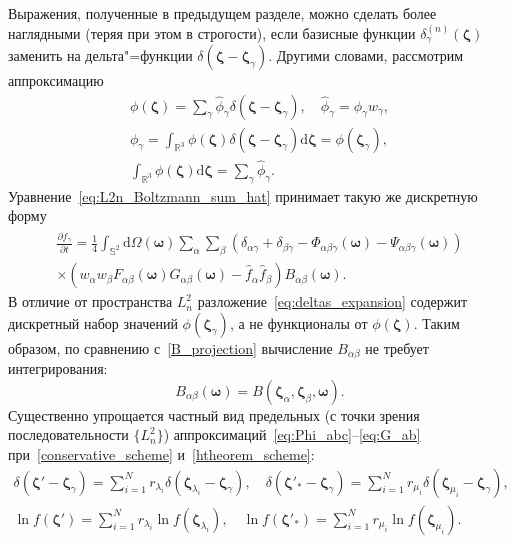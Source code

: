 \documentclass{article}
\newcommand{\dd}{\mathrm{d}}
\newcommand{\pder}[2][]{\frac{\partial#1}{\partial#2}}
\newcommand{\dzeta}{\boldsymbol{\dd\zeta}}
\newcommand{\bzeta}{\boldsymbol{\zeta}}
\newcommand{\bomega}{\boldsymbol{\omega}}
\begin{document}
Выражения, полученные в предыдущем разделе, можно сделать более наглядными (теряя при этом в строгости),
если базисные функции \(\delta^{(n)}_\gamma(\bzeta)\) заменить на дельта"=функции \(\delta(\bzeta-\bzeta_\gamma)\).
Другими словами, рассмотрим аппроксимацию
\begin{gather}
    \phi(\bzeta) = \sum_\gamma \hat{\phi}_\gamma \delta(\bzeta-\bzeta_\gamma),
    \quad \hat{\phi}_\gamma = \phi_\gamma w_\gamma, \label{eq:deltas_expansion} \\
    \phi_\gamma = \int_{\mathbb{R}^3} \phi(\bzeta) \delta(\bzeta-\bzeta_\gamma) \dzeta = \phi(\bzeta_\gamma), \label{eq:deltas_coords} \\
    \int_{\mathbb{R}^3} \phi(\bzeta)\dzeta = \sum_\gamma \hat{\phi}_\gamma. \label{eq:deltas_integral}
\end{gather}
Уравнение~\eqref{eq:L2n_Boltzmann_sum_hat} принимает такую же дискретную форму
\begin{multline}\label{eq:deltas_Boltzmann_sum_hat}
    \pder[\hat{f}_\gamma]{t} =
        \frac14\int_{\mathbb{S}^2}\dd\Omega(\bomega) \sum_\alpha \sum_\beta
        \left(\delta_{\alpha\gamma} + \delta_{\beta\gamma}
            - \Phi_{\alpha\beta\gamma}(\bomega) - \Psi_{\alpha\beta\gamma}(\bomega)\right) \\
        \times\left(w_\alpha w_\beta F_{\alpha\beta}(\bomega)G_{\alpha\beta}(\bomega)
            - \hat{f}_\alpha \hat{f}_\beta\right)
        B_{\alpha\beta}(\bomega).
\end{multline}
В отличие от пространства \(L^2_n\) разложение~\eqref{eq:deltas_expansion} содержит дискретный набор значений \(\phi(\bzeta_\gamma)\),
а не функционалы от \(\phi(\bzeta)\). Таким образом, по сравнению с~\eqref{B_projection} вычисление \(B_{\alpha\beta}\)
не требует интегрирования:
\begin{equation}\label{B_exact}
    B_{\alpha\beta}(\bomega) = B(\bzeta_\alpha,\bzeta_\beta,\bomega).
\end{equation}
Существенно упрощается частный вид предельных (с точки зрения последовательности \(\{L^2_n\}\))
аппроксимаций~\eqref{eq:Phi_abc}--\eqref{eq:G_ab} при~\eqref{conservative_scheme} и~\eqref{htheorem_scheme}:
\begin{gather}
    \delta(\bzeta'-\bzeta_\gamma) = \sum_{i=1}^N r_{\lambda_i} \delta(\bzeta_{\lambda_i}-\bzeta_\gamma), \quad
    \delta(\bzeta'_*-\bzeta_\gamma) = \sum_{i=1}^N r_{\mu_i}\delta(\bzeta_{\mu_i}-\bzeta_\gamma), \label{eq:deltas_conservative}\\
    \ln f(\bzeta') = \sum_{i=1}^N r_{\lambda_i} \ln f(\bzeta_{\lambda_i}), \quad
    \ln f(\bzeta'_*) = \sum_{i=1}^N r_{\mu_i} \ln f(\bzeta_{\mu_i}). \label{eq:deltas_htheorem}
\end{gather}
\end{document}
